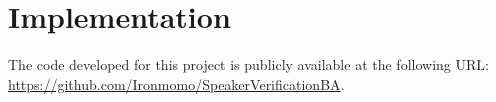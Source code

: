 \section{Implementation}\label{sec:implementation}
The code developed for this project is publicly available at the following URL:\\ \href{https://github.com/Ironmomo/SpeakerVerificationBA}{https://github.com/Ironmomo/SpeakerVerificationBA}.































